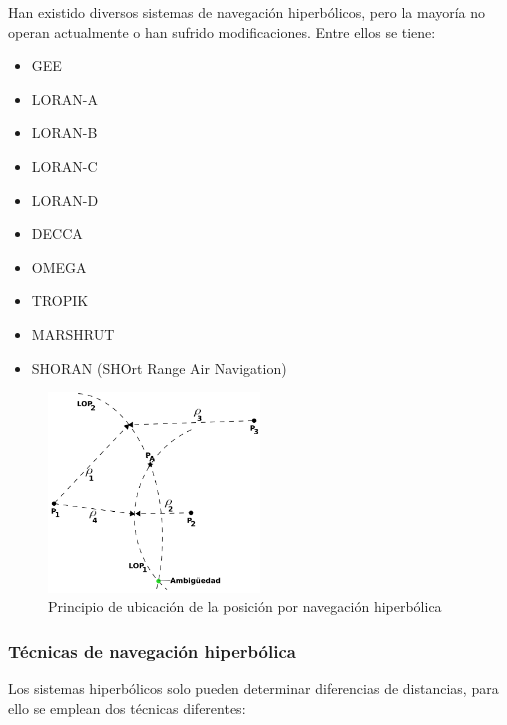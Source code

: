 Han existido diversos sistemas de navegaci\'on hiperb\'olicos, pero la mayor\'ia no operan actualmente o han sufrido modificaciones. Entre ellos se tiene:
\begin{multicols}{2}
\begin{itemize}
\item GEE

\item LORAN-A
\item  LORAN-B
\item LORAN-C
\item LORAN-D

\item DECCA

\item OMEGA

\item TROPIK

\item MARSHRUT

\item SHORAN (SHOrt Range Air Navigation)
\end{itemize}
\end{multicols}

\begin{figure}[!h]
  \centering
  \includegraphics[width=0.5\textwidth]{06.radionavegacion/Imagenes/06.01.adf/hiperbolic-fix.png}
  \caption{Principio de ubicaci\'on de la posici\'on por navegaci\'on hiperb\'olica}
  \label{fig:principio.navegacion.hiperbolica}
\end{figure}


\subsubsection{T\'ecnicas de navegaci\'on hiperb\'olica}

Los sistemas hiperb\'olicos solo pueden determinar diferencias de distancias, para ello se emplean dos t\'ecnicas diferentes:

